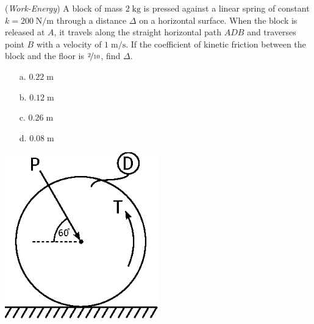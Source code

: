 \documentclass[addpoints, 12pt]{exam}
\begin{document}
\begin{questions}
\begin{minipage}{0.5\textwidth}
\question(\textit{Work-Energy})
A block of mass $2 \; \unit{\kilo\gram}$ is pressed against a linear spring of 
constant $k = 200 \; \unit{\newton\per\meter}$ through a distance $\Delta$ on a 
horizontal surface. When the block is released at $A$, it travels along the 
straight horizontal path $ADB$ and traverses point $B$ with a velocity of $1 \;
\unit{\meter\per\second}$. If the coefficient of kinetic friction between the 
block and the floor is $\nicefrac{2}{10}$, find $\Delta$. \\[0.5ex]

\begin{minipage}{0.45\textwidth}
    \begin{center}
    \begin{itemize}
        \setlength\itemsep{-0.4em}
        \item[a.] $0.22 \; \unit{\meter}$
        \item[b.] $0.12 \; \unit{\meter}$
    \end{itemize}
    \end{center}
\end{minipage}
\begin{minipage}{0.45\textwidth}
    \begin{center}
    \begin{itemize}
        \setlength\itemsep{-0.4em}
        \item[c.] $0.26 \; \unit{\meter}$
        \item[d.] $0.08 \; \unit{\meter}$
    \end{itemize}
    \end{center}
\end{minipage}

\end{minipage}
%
\begin{minipage}{0.5\textwidth}
    \centering
    \includegraphics[width=0.5\textwidth,valign=c]{./figures/question6.eps}
\end{minipage}




\end{questions}
\end{document}
